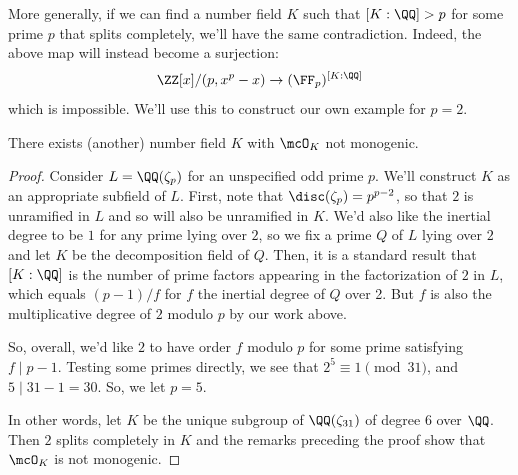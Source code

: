 More generally, if we can find a number field $K$ such that $[K:\QQ] > p$ for some prime $p$ that splits completely, we'll have the same contradiction. Indeed, the above map will instead become a surjection:
\[ \ZZ[x]/(p,x^p-x) \to (\FF_p)^{[K:\QQ]} \]
which is impossible. We'll use this to construct our own example for $p=2$.

\begin{thm} There exists (another) number field $K$ with $\mcO_K$ not monogenic. \end{thm}
\begin{proof}
	Consider $L = \QQ(\zeta_p)$ for an unspecified odd prime $p$. We'll construct $K$ as an appropriate subfield of $L$. First, note that $\disc(\zeta_p) = p^{p-2}$, so that $2$ is unramified in $L$ and so will also be unramified in $K$. We'd also like the inertial degree to be $1$ for any prime lying over $2$, so we fix a prime $Q$ of $L$ lying over $2$ and let $K$ be the decomposition field of $Q$. Then, it is a standard result that $[K:\QQ]$ is the number of prime factors appearing in the factorization of $2$ in $L$, which equals $(p-1)/f$ for $f$ the inertial degree of $Q$ over 2. But $f$ is also the multiplicative degree of $2$ modulo $p$ by our work above.
	
	So, overall, we'd like $2$ to have order $f$ modulo $p$ for some prime satisfying $f \mid p-1$. Testing some primes directly, we see that $2^5 \equiv 1 \pmod{31}$, and $5 \mid 31-1 = 30$. So, we let $p=5$.
	
	In other words, let $K$ be the unique subgroup of $\QQ(\zeta_{31})$ of degree $6$ over $\QQ$. Then $2$ splits completely in $K$ and the remarks preceding the proof show that $\mcO_K$ is not monogenic.
\end{proof}











